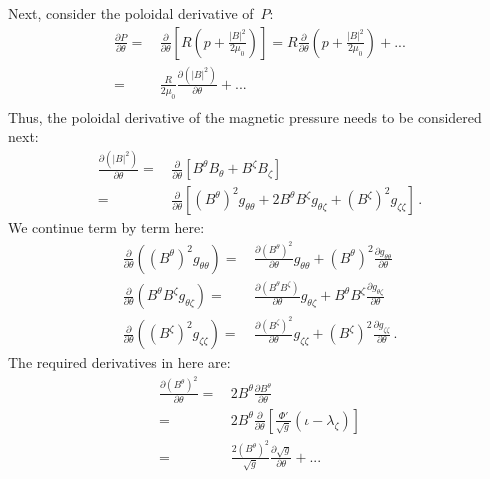 %
Next, consider the poloidal derivative of~$P$:
\begin{align}
 \frac{\partial P}{\partial \theta}
 =&\, \frac{\partial}{\partial \theta}
        \left[ R \left( p + \frac{|B|^2}{2 \mu_0} \right) \right]
 = R \frac{\partial}{\partial \theta} \left( p + \frac{|B|^2}{2 \mu_0} \right) + ... \nonumber \\
 =&\, \frac{R}{2 \mu_0} \frac{\partial \left( |B|^2 \right)}{\partial \theta} + ... \nonumber \\
\end{align}
%
Thus, the poloidal derivative of the magnetic pressure needs to be considered next:
\begin{align}
 \frac{\partial \left( |B|^2 \right)}{\partial \theta}
 =&\, \frac{\partial}{\partial \theta} \left[
        B^\theta B_\theta + B^\zeta B_\zeta
      \right] \nonumber \\
 =&\, \frac{\partial}{\partial \theta} \left[
        (B^\theta)^2       g_{\theta \theta}
      + 2 B^\theta B^\zeta g_{\theta \zeta}
      + (B^\zeta)^2        g_{\zeta \zeta}
      \right] \, .
\end{align}
%
We continue term by term here:
\begin{align}
 \frac{\partial}{\partial \theta} \left( (B^\theta)^2 g_{\theta \theta} \right)
 =&\,   \frac{\partial (B^\theta)^2}{\partial \theta} g_{\theta \theta}
      + (B^\theta)^2 \frac{\partial g_{\theta \theta}}{\partial \theta} \nonumber \\
%
 \frac{\partial}{\partial \theta} \left( B^\theta B^\zeta g_{\theta \zeta} \right)
 =&\,   \frac{\partial (B^\theta B^\zeta)}{\partial \theta} g_{\theta \zeta}
      + B^\theta B^\zeta \frac{\partial g_{\theta \zeta}}{\partial \theta} \nonumber \\
%
 \frac{\partial}{\partial \theta} \left( (B^\zeta)^2 g_{\zeta \zeta} \right)
 =&\,   \frac{\partial (B^\zeta)^2}{\partial \theta} g_{\zeta \zeta}
      + (B^\zeta)^2 \frac{\partial g_{\zeta \zeta}}{\partial \theta} \, .
\end{align}
The required derivatives in here are:
\begin{align}
 \frac{\partial (B^\theta)^2}{\partial \theta}
 =&\, 2 B^\theta \frac{\partial B^\theta}{\partial \theta} \nonumber \\
 =&\, 2 B^\theta \frac{\partial}{\partial \theta}
      \left[ \frac{\Phi'}{\sqrt{g}} \left( \iota - \lambda_\zeta  \right) \right] \nonumber \\
 =&\, \frac{2 \left( B^\theta \right)^2}{\sqrt{g}}
        \frac{\partial \sqrt{g}}{\partial \theta} + ...
\end{align}
